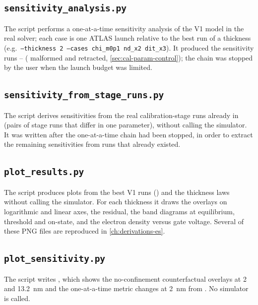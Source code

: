 \subsection{\texttt{sensitivity\_analysis.py}}
The script performs a one-at-a-time sensitivity analysis of the V1 model in the real solver; each case is one ATLAS
launch relative to the best run of a thickness (e.g.\ \texttt{--thickness 2 --cases chi\_m0p1 nd\_x2 dit\_x3}). It
produced the sensitivity runs -- ( malformed and retracted, \cref{sec:cal-param-control});
the chain was stopped by the user when the launch budget was limited.


\subsection{\texttt{sensitivity\_from\_stage\_runs.py}}
The script derives sensitivities from the real calibration-stage runs already in  (pairs of stage runs
that differ in one parameter), without calling the simulator. It was written after the one-at-a-time chain had been
stopped, in order to extract the remaining sensitivities from runs that already existed.


\subsection{\texttt{plot\_results.py}}
The script produces plots from the best V1 runs () and the thickness laws without calling
the simulator. For each thickness it draws the overlays on logarithmic and linear axes, the residual, the band diagrams
at equilibrium, threshold and on-state, and the electron density versus gate voltage. Several of these PNG files are
reproduced in \cref{ch:derivations-es}.


\subsection{\texttt{plot\_sensitivity.py}}
The script writes , which shows the no-confinement counterfactual overlays at 2 and
\SI{13.2}{nm} and the one-at-a-time metric changes at \SI{2}{nm} from . No simulator is
called.


